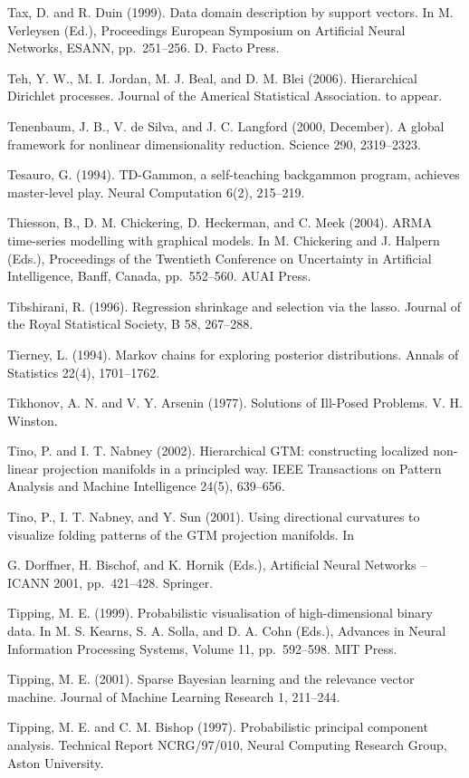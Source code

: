 \documentclass[
  10
]{article}
\begin{document}
Tax, D. and R. Duin (1999). Data domain description by support vectors.
In M. Verleysen (Ed.), Proceedings European Symposium on Artificial
Neural Networks, ESANN, pp.~251--256. D. Facto Press.

Teh, Y. W., M. I. Jordan, M. J. Beal, and D. M. Blei (2006).
Hierarchical Dirichlet processes. Journal of the Americal Statistical
Association. to appear.

Tenenbaum, J. B., V. de Silva, and J. C. Langford (2000, December). A
global framework for nonlinear dimensionality reduction. Science 290,
2319--2323.

Tesauro, G. (1994). TD-Gammon, a self-teaching backgammon program,
achieves master-level play. Neural Computation 6(2), 215--219.

Thiesson, B., D. M. Chickering, D. Heckerman, and C. Meek (2004). ARMA
time-series modelling with graphical models. In M. Chickering and J.
Halpern (Eds.), Proceedings of the Twentieth Conference on Uncertainty
in Artificial Intelligence, Banff, Canada, pp.~552--560. AUAI Press.

Tibshirani, R. (1996). Regression shrinkage and selection via the lasso.
Journal of the Royal Statistical Society, B 58, 267--288.

Tierney, L. (1994). Markov chains for exploring posterior distributions.
Annals of Statistics 22(4), 1701--1762.

Tikhonov, A. N. and V. Y. Arsenin (1977). Solutions of Ill-Posed
Problems. V. H. Winston.

Tino, P. and I. T. Nabney (2002). Hierarchical GTM: constructing
localized non-linear projection manifolds in a principled way. IEEE
Transactions on Pattern Analysis and Machine Intelligence 24(5),
639--656.

Tino, P., I. T. Nabney, and Y. Sun (2001). Using directional curvatures
to visualize folding patterns of the GTM projection manifolds. In

G. Dorffner, H. Bischof, and K. Hornik (Eds.), Artificial Neural
Networks -- ICANN 2001, pp.~421--428. Springer.

Tipping, M. E. (1999). Probabilistic visualisation of high-dimensional
binary data. In M. S. Kearns, S. A. Solla, and D. A. Cohn (Eds.),
Advances in Neural Information Processing Systems, Volume 11,
pp.~592--598. MIT Press.

Tipping, M. E. (2001). Sparse Bayesian learning and the relevance vector
machine. Journal of Machine Learning Research 1, 211--244.

Tipping, M. E. and C. M. Bishop (1997). Probabilistic principal
component analysis. Technical Report NCRG/97/010, Neural Computing
Research Group, Aston University.
\end{document}
